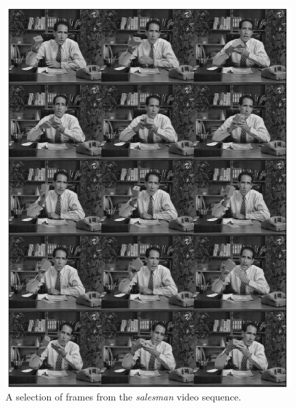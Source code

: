 \documentclass[twoside,11pt]{article}
\numberwithin{equation}{section}
\numberwithin{theorem}{section}
\begin{document}
\begin{figure}[p]
 \centering
 \includegraphics[width = 0.98\textwidth]{salesman}
 \caption{
  \label{fig:videoClean}
  A selection of frames from the {\it salesman} video sequence.
 }
\end{figure}
\end{document}
